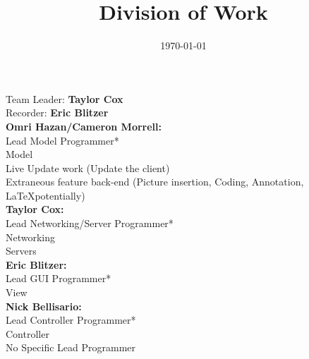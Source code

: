 \documentclass[12pt]{article}
\begin{document}
\title{Division of Work}
\date{\today}
\maketitle 

\noindent Team Leader: \textbf{Taylor Cox}\\
\noindent Recorder: \textbf{Eric Blitzer}\\

\noindent \textbf{Omri Hazan/Cameron Morrell:}\\
Lead Model Programmer*\\
Model\\
Live Update work (Update the client)\\
Extraneous feature back-end (Picture insertion, Coding, Annotation, \LaTeX potentially) \\

\noindent \textbf{Taylor Cox:}\\
Lead Networking/Server Programmer*\\
Networking\\
Servers\\

\noindent \textbf{Eric Blitzer:}\\
Lead GUI Programmer*\\
View\\

\noindent \textbf{Nick Bellisario:}\\
Lead Controller Programmer*\\
Controller\\


\noindent *No Specific Lead Programmer
\end{document}
